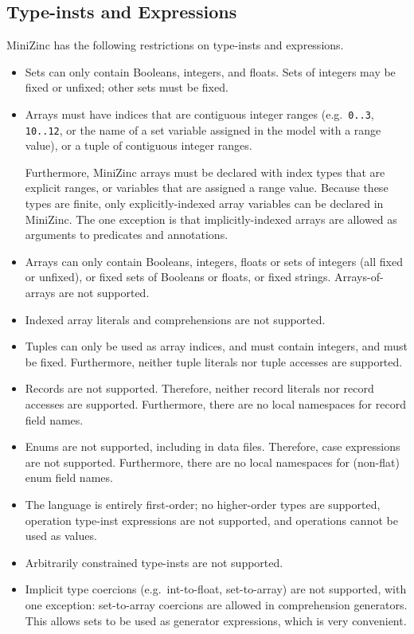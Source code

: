 \documentclass[10pt]{scrartcl}
\begin{document}
{\subsection{Type-insts and Expressions}
MiniZinc has the following restrictions on type-insts and expressions.
\begin{itemize}
\item
    Sets can only contain Booleans, integers, and floats.  Sets of integers
    may be fixed or unfixed;  other sets must be fixed.
\item
    Arrays must have indices that are contiguous integer ranges
    (e.g.~\texttt{0..3}, \texttt{10..12}, or the name of a set variable
    assigned in the model with a range value), or a tuple of contiguous
    integer ranges.

    Furthermore, MiniZinc arrays must be declared with index types that are
    explicit ranges, or variables that are assigned a range value.  Because
    these types are finite, only explicitly-indexed array variables can be
    declared in MiniZinc.  The one exception is that implicitly-indexed
    arrays are allowed as arguments to predicates and annotations.
\item
    Arrays can only contain Booleans, integers, floats or sets of integers
    (all fixed or unfixed), or fixed sets of Booleans or floats, or fixed
    strings.  Arrays-of-arrays are not supported.
\item
    Indexed array literals and comprehensions are not supported.
\item
    Tuples can only be used as array indices, and must contain integers, and
    must be fixed.  Furthermore, neither tuple literals nor tuple accesses
    are supported.
\item
    Records are not supported.  Therefore, neither record literals nor
    record accesses are supported.  Furthermore, there are no local
    namespaces for record field names.
\item
    Enums are not supported, including in data files.  Therefore, case
    expressions are not supported.  Furthermore, there are no local
    namespaces for (non-flat) enum field names.
\item
    The language is entirely first-order;  no higher-order types are
    supported, operation type-inst expressions are not supported, and
    operations cannot be used as values.
\item
    Arbitrarily constrained type-insts are not supported.
\item
    Implicit type coercions (e.g.~int-to-float, set-to-array) are not supported,
    with one exception: set-to-array coercions are allowed in comprehension
    generators.  This allows sets to be used as generator expressions, which
    is very convenient.


\end{itemize}}
\end{document}
